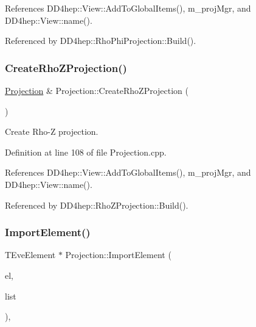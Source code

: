 References D\+D4hep\+::\+View\+::\+Add\+To\+Global\+Items(), m\+\_\+proj\+Mgr, and D\+D4hep\+::\+View\+::name().



Referenced by D\+D4hep\+::\+Rho\+Phi\+Projection\+::\+Build().

\hypertarget{class_d_d4hep_1_1_projection_ade3fca7391ef9616f9b9235d4e07a423}{}\label{class_d_d4hep_1_1_projection_ade3fca7391ef9616f9b9235d4e07a423} 
\subsubsection{\texorpdfstring{Create\+Rho\+Z\+Projection()}{CreateRhoZProjection()}}
{\footnotesize\ttfamily \hyperlink{class_d_d4hep_1_1_projection}{Projection} \& Projection\+::\+Create\+Rho\+Z\+Projection (\begin{DoxyParamCaption}{ }\end{DoxyParamCaption})\hspace{0.3cm}{\ttfamily [virtual]}}



Create Rho-\/Z projection. 



Definition at line 108 of file Projection.\+cpp.



References D\+D4hep\+::\+View\+::\+Add\+To\+Global\+Items(), m\+\_\+proj\+Mgr, and D\+D4hep\+::\+View\+::name().



Referenced by D\+D4hep\+::\+Rho\+Z\+Projection\+::\+Build().

\hypertarget{class_d_d4hep_1_1_projection_ad68a569fdc412f5ed8769e89df3dd821}{}\label{class_d_d4hep_1_1_projection_ad68a569fdc412f5ed8769e89df3dd821} 
\subsubsection{\texorpdfstring{Import\+Element()}{ImportElement()}}
{\footnotesize\ttfamily T\+Eve\+Element $\ast$ Projection\+::\+Import\+Element (\begin{DoxyParamCaption}\item[{T\+Eve\+Element $\ast$}]{el,  }\item[{\hyperlink{class_t_eve_element_list}{T\+Eve\+Element\+List} $\ast$}]{list }\end{DoxyParamCaption})\hspace{0.3cm}{\ttfamily [protected]}, {\ttfamily [virtual]}}



